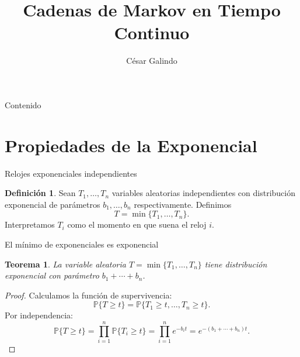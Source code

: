 \documentclass[aspectratio=169]{beamer}
\title{Cadenas de Markov en Tiempo Continuo}
\author{César Galindo}
\date{}
\theoremstyle{plain}
\newtheorem{teorema}{Teorema}
\theoremstyle{definition}
\newtheorem{definicion}{Definición}
\newcommand{\Prob}{\mathbb{P}}
\newcommand{\1}{\mathbf{1}}
\begin{document}
\begin{frame}
  \titlepage
\end{frame}

\begin{frame}{Contenido}
  \tableofcontents
\end{frame}

\section{Propiedades de la Exponencial}

\begin{frame}{Relojes exponenciales independientes}
  \begin{definicion}
    Sean $T_1,\ldots,T_n$ variables aleatorias independientes con distribución exponencial de parámetros $b_1, \ldots, b_n$ respectivamente. Definimos
    \[ T = \min\{T_1, \ldots, T_n\}. \]
    Interpretamos $T_i$ como el momento en que suena el reloj $i$.
  \end{definicion}
  
  \vspace{0.5cm}
  
  \begin{center}
  \end{center}
\end{frame}

\begin{frame}{El mínimo de exponenciales es exponencial}
  \begin{teorema}
    La variable aleatoria $T = \min\{T_1, \ldots, T_n\}$ tiene distribución exponencial con parámetro $b_1 + \cdots + b_n$.
  \end{teorema}
  
  \begin{proof}
    Calculamos la función de supervivencia:
    \[
    \Prob\{T \geq t\} = \Prob\{T_1 \geq t, \ldots, T_n \geq t\}.
    \]
    Por independencia:
    \[
    \Prob\{T \geq t\} = \prod_{i=1}^n \Prob\{T_i \geq t\} = \prod_{i=1}^n e^{-b_i t} = e^{-(b_1 + \cdots + b_n)t}.
    \]
  \end{proof}
\end{frame}
\end{document}
